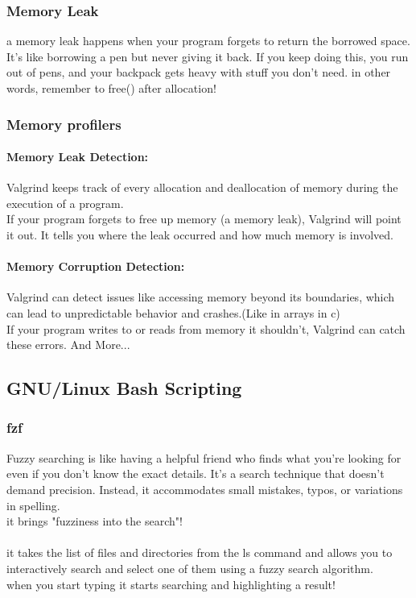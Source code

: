 \documentclass[titlepage]{article}
\begin{document}
\subsubsection{Memory Leak}
a memory leak happens when your program forgets to return the borrowed space. It's like borrowing a pen but never giving it back. If you keep doing this, you run out of pens, and your backpack gets heavy with stuff you don't need.\newline
in other words, remember to free() after allocation!
\subsubsection{Memory profilers}
\paragraph{Memory Leak Detection:}
Valgrind keeps track of every allocation and deallocation of memory during the execution of a program.\\
If your program forgets to free up memory (a memory leak), Valgrind will point it out. It tells you where the leak occurred and how much memory is involved.
\paragraph{Memory Corruption Detection:}
Valgrind can detect issues like accessing memory beyond its boundaries, which can lead to unpredictable behavior and crashes.(Like in arrays in c)\\
If your program writes to or reads from memory it shouldn't, Valgrind can catch these errors.
And More...
\subsection{GNU/Linux Bash Scripting}
\subsubsection{fzf}
Fuzzy searching is like having a helpful friend who finds what you're looking for even if you don't know the exact details. It's a search technique that doesn't demand precision. Instead, it accommodates small mistakes, typos, or variations in spelling.
\\ it brings "fuzziness into the search"!
\\\\
it takes the list of files and directories from the ls command and allows you to interactively search and select one of them using a fuzzy search algorithm.\\
when you start typing it starts searching and highlighting a result!
\end{document}
